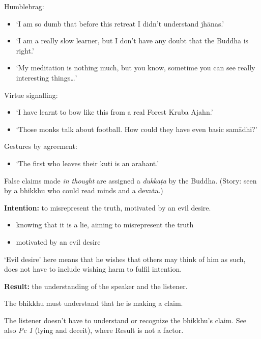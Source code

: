 Humblebrag:

\begin{itemize}
\tightlist
\item
  `I am so dumb that before this retreat I didn't understand jhānas.'
\item
  `I am a really slow learner, but I don't have any doubt that the
  Buddha is right.'
\item
  `My meditation is nothing much, but you know, sometime you can see
  really interesting things\ldots{}'
\end{itemize}

Virtue signalling:

\begin{itemize}
\tightlist
\item
  `I have learnt to bow like this from a real Forest Kruba Ajahn.'
\item
  `Those monks talk about football. How could they have even basic
  samādhi?'
\end{itemize}

\clearpage

Gestures by agreement:

\begin{itemize}
\tightlist
\item
  `The first who leaves their kuti is an arahant.'
\end{itemize}

False claims made \emph{in thought} are assigned a \emph{dukkaṭa} by the
Buddha. (Story: seen by a bhikkhu who could read minds and a devata.)

\textbf{Intention:} to misrepresent the truth, motivated by an evil
desire.

\begin{itemize}
\tightlist
\item
  knowing that it is a lie, aiming to misrepresent the truth
\item
  motivated by an evil desire
\end{itemize}

`Evil desire' here means that he wishes that others may think of him as
such, does not have to include wishing harm to fulfil intention.

\textbf{Result:} the understanding of the speaker and the listener.

The bhikkhu must understand that he is making a claim.

The listener doesn't have to understand or recognize the bhikkhu's
claim. See also \emph{Pc 1} (lying and deceit), where Result is not a
factor.

